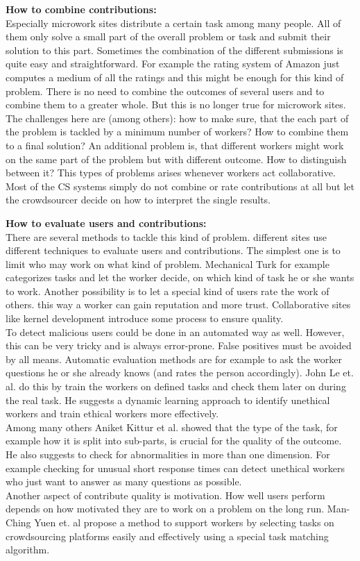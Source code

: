 \documentclass{acm_proc_article-sp}
\begin{document}
  \textbf{How to combine contributions: }\\
  Especially microwork sites distribute a certain task among many people. All of them only solve a small part of the overall problem or task and submit their solution to this part. Sometimes the combination of the different submissions is quite easy and straightforward. For example the rating system of Amazon just computes a medium of all the ratings and this might be enough for this kind of problem. There is no need to combine the outcomes of several users and to combine them to a greater whole. But this is no longer true for microwork sites. The challenges here are (among others): how to make sure, that the each part of the problem is tackled by a minimum number of workers? How to combine them to a final solution? An additional problem is, that different workers might work on the same part of the problem but with different outcome. How to distinguish between it? This types of problems arises whenever workers act collaborative. Most of the CS systems simply do not combine or rate contributions at all but let the crowdsourcer decide on how to interpret the single results.

  \textbf{How to evaluate users and contributions: }\\ 
  There are several methods to tackle this kind of problem. different sites use different techniques to evaluate users and contributions. The simplest one is to limit who may work on what kind of problem. Mechanical Turk for example categorizes tasks and let the worker decide, on which  kind of task he or she wants to work. Another possibility is to let a special kind of users rate the work of others. this way a worker can gain reputation and more trust. Collaborative sites like kernel development introduce some process to ensure quality.\\
  To detect malicious users could be done in an automated way as well. However, this can be very tricky and is always error-prone. False positives must be avoided by all means. Automatic evaluation methods are for example to ask the worker questions he or she already knows (and rates the person accordingly). John Le et. al.\cite{le:ensure} do this by train the workers on defined tasks and check them later on during the real task. He suggests a dynamic learning approach to identify unethical workers and train ethical workers more effectively.\\
  Among many others Aniket Kittur et al. showed that the type of the task, for example how it is split into sub-parts, is crucial for the quality of the outcome\cite{kittur:studies}. He also suggests to check for abnormalities in more than one dimension. For example checking for unusual short response times can detect unethical workers who just want to answer as many questions as possible.\\
  \balancecolumns
  Another aspect of contribute quality is motivation. How well users perform depends on how motivated they are to work on a problem on the long run. Man-Ching Yuen et. al propose a method to support workers by selecting tasks on crowdsourcing platforms easily and effectively using a special task matching algorithm\cite{yuen:select}.
\end{document}
